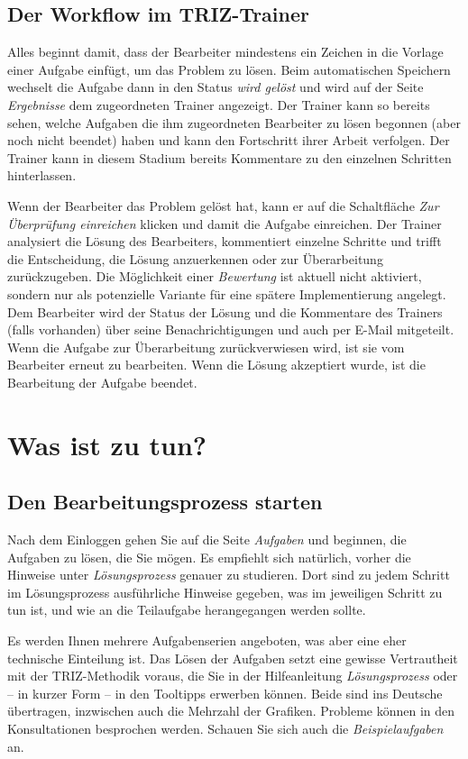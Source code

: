 \documentclass[11pt,a4paper]{article}
\begin{document}
\subsection{Der Workflow im TRIZ-Trainer}

Alles beginnt damit, dass der Bearbeiter mindestens ein Zeichen in die Vorlage
einer Aufgabe einfügt, um das Problem zu lösen. Beim automatischen Speichern
wechselt die Aufgabe dann in den Status \emph{wird gelöst} und wird auf der
Seite \emph{Ergebnisse} dem zugeordneten Trainer angezeigt. Der Trainer kann
so bereits sehen, welche Aufgaben die ihm zugeordneten Bearbeiter zu lösen
begonnen (aber noch nicht beendet) haben und kann den Fortschritt ihrer Arbeit
verfolgen. Der Trainer kann in diesem Stadium bereits Kommentare zu den
einzelnen Schritten hinterlassen.

Wenn der Bearbeiter das Problem gelöst hat, kann er auf die Schaltfläche
\emph{Zur Überprüfung einreichen} klicken und damit die Aufgabe einreichen.
Der Trainer analysiert die Lösung des Bearbeiters, kommentiert einzelne
Schritte und trifft die Entscheidung, die Lösung anzuerkennen oder zur
Überarbeitung zurückzugeben. Die Möglichkeit einer \emph{Bewertung} ist
aktuell nicht aktiviert, sondern nur als potenzielle Variante für eine spätere
Implementierung angelegt. Dem Bearbeiter wird der Status der Lösung und die
Kommentare des Trainers (falls vorhanden) über seine Benachrichtigungen und
auch per E-Mail mitgeteilt.  Wenn die Aufgabe zur Überarbeitung
zurückverwiesen wird, ist sie vom Bearbeiter erneut zu bearbeiten. Wenn die
Lösung akzeptiert wurde, ist die Bearbeitung der Aufgabe beendet.

\section{Was ist zu tun?}

\subsection{Den Bearbeitungsprozess starten}

Nach dem Einloggen gehen Sie auf die Seite \emph{Aufgaben} und beginnen, die
Aufgaben zu lösen, die Sie mögen.  Es empfiehlt sich natürlich, vorher die
Hinweise unter \emph{Lösungsprozess} genauer zu studieren.  Dort sind zu jedem
Schritt im Lösungsprozess ausführliche Hinweise gegeben, was im jeweiligen
Schritt zu tun ist, und wie an die Teilaufgabe herangegangen werden sollte.

Es werden Ihnen mehrere Aufgabenserien angeboten, was aber eine eher
technische Einteilung ist.  Das Lösen der Aufgaben setzt eine gewisse
Vertrautheit mit der TRIZ-Methodik voraus, die Sie in der Hilfeanleitung
\emph{Lösungsprozess} oder -- in kurzer Form -- in den Tooltipps erwerben
können.  Beide sind ins Deutsche übertragen, inzwischen auch die Mehrzahl der
Grafiken. Probleme können in den Konsultationen besprochen werden.  Schauen
Sie sich auch die \emph{Beispielaufgaben} an.
\end{document}
